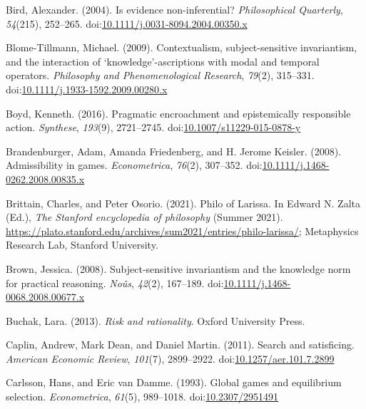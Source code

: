 \documentclass[
  12pt,
  letterpaper,
]{scrbook}
\newlength{\cslhangindent}
\newenvironment{CSLReferences}[2] %
 {\begin{list}{}{%
  \setlength{\itemindent}{0pt}
  \setlength{\leftmargin}{0pt}
  \setlength{\parsep}{0pt}
  \ifodd #1
   \setlength{\leftmargin}{\cslhangindent}
   \setlength{\itemindent}{-1\cslhangindent}
  \fi
  \setlength{\itemsep}{#2\baselineskip}}}
 {\end{list}}
\begin{document}
\begin{CSLReferences}{1}{0}
Bird, Alexander. (2004). Is evidence non-inferential?
\emph{Philosophical Quarterly}, \emph{54}(215), 252--265.
doi:\href{https://doi.org/10.1111/j.0031-8094.2004.00350.x}{10.1111/j.0031-8094.2004.00350.x}

Blome-Tillmann, Michael. (2009). Contextualism, subject-sensitive
invariantism, and the interaction of {`knowledge'}-ascriptions with
modal and temporal operators. \emph{Philosophy and Phenomenological
Research}, \emph{79}(2), 315--331.
doi:\href{https://doi.org/10.1111/j.1933-1592.2009.00280.x}{10.1111/j.1933-1592.2009.00280.x}

Boyd, Kenneth. (2016). Pragmatic encroachment and epistemically
responsible action. \emph{Synthese}, \emph{193}(9), 2721--2745.
doi:\href{https://doi.org/10.1007/s11229-015-0878-y}{10.1007/s11229-015-0878-y}

Brandenburger, Adam, Amanda Friedenberg, and H. Jerome Keisler. (2008).
Admissibility in games. \emph{Econometrica}, \emph{76}(2), 307--352.
doi:\href{https://doi.org/10.1111/j.1468-0262.2008.00835.x}{10.1111/j.1468-0262.2008.00835.x}

Brittain, Charles, and Peter Osorio. (2021). {Philo of Larissa}. In
Edward N. Zalta (Ed.), \emph{The {Stanford} encyclopedia of philosophy}
({S}ummer 2021).
\url{https://plato.stanford.edu/archives/sum2021/entries/philo-larissa/};
Metaphysics Research Lab, Stanford University.

Brown, Jessica. (2008). Subject-sensitive invariantism and the knowledge
norm for practical reasoning. \emph{No{û}s}, \emph{42}(2), 167--189.
doi:\href{https://doi.org/10.1111/j.1468-0068.2008.00677.x}{10.1111/j.1468-0068.2008.00677.x}

Buchak, Lara. (2013). \emph{Risk and rationality}. Oxford University
Press.

Caplin, Andrew, Mark Dean, and Daniel Martin. (2011). Search and
satisficing. \emph{American Economic Review}, \emph{101}(7), 2899--2922.
doi:\href{https://doi.org/10.1257/aer.101.7.2899}{10.1257/aer.101.7.2899}

Carlsson, Hans, and Eric van Damme. (1993). Global games and equilibrium
selection. \emph{Econometrica}, \emph{61}(5), 989--1018.
doi:\href{https://doi.org/10.2307/2951491}{10.2307/2951491}


\end{CSLReferences}
\end{document}
